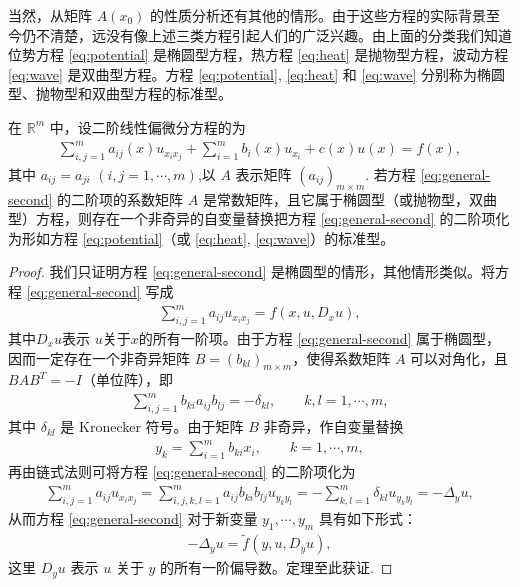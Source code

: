 \documentclass[../../main.tex]{subfiles}%
\begin{document}
当然，从矩阵 $A(x_0)$ 的性质分析还有其他的情形。由于这些方程的实际背景至今仍不清楚，远没有像上述三类方程引起人们的广泛兴趣。由上面的分类我们知道位势方程 \eqref{eq:potential} 是椭圆型方程，热方程 \eqref{eq:heat} 是抛物型方程，波动方程 \eqref{eq:wave} 是双曲型方程。方程 \eqref{eq:potential}, \eqref{eq:heat} 和 \eqref{eq:wave} 分别称为椭圆型、抛物型和双曲型方程的标准型。

\begin{theorem}
在 $\mathbb{R}^m$ 中，设二阶线性偏微分方程的为
\begin{align}
\sum_{i,j=1}^{m} a_{ij}(x) u_{x_i x_j} + \sum_{i=1}^{m} b_i(x) u_{x_i} + c(x) u(x) = f(x), \label{eq:general-second}
\end{align}
其中 $a_{ij}=a_{ji}$ $(i,j=1,\cdots,m)$,以 $A$ 表示矩阵 $(a_{ij})_{m\times m}$.
若方程 \eqref{eq:general-second} 的二阶项的系数矩阵 $A$ 是常数矩阵，且它属于椭圆型（或抛物型，双曲型）方程，则存在一个非奇异的自变量替换把方程 \eqref{eq:general-second} 的二阶项化为形如方程 \eqref{eq:potential}（或 \eqref{eq:heat}, \eqref{eq:wave}）的标准型。
\end{theorem}
\begin{proof}
我们只证明方程 \eqref{eq:general-second} 是椭圆型的情形，其他情形类似。将方程 \eqref{eq:general-second} 写成
\begin{align*}
\sum_{i,j=1}^{m} a_{ij} u_{x_i x_j}= f(x,u,D_x u),
\end{align*}
其中$D_x u$表示 $u$关于$x$的所有一阶项。由于方程 \eqref{eq:general-second} 属于椭圆型，因而一定存在一个非奇异矩阵 $B=(b_{kl})_{m\times m}$，使得系数矩阵 $A$ 可以对角化，且 $BAB^T = -I$（单位阵），即
\begin{align*}
\sum_{i,j=1}^{m} b_{ki} a_{ij} b_{lj} = -\delta_{kl}, \qquad k,l=1,\cdots,m,
\end{align*}
其中 $\delta_{kl}$ 是 Kronecker 符号。由于矩阵 $B$ 非奇异，作自变量替换
\begin{align*}
y_k = \sum_{i=1}^{m} b_{ki} x_i, \qquad k=1,\cdots,m,
\end{align*}
再由链式法则可将方程 \eqref{eq:general-second} 的二阶项化为
\begin{align*}
\sum_{i,j=1}^{m} a_{ij} u_{x_i x_j}
= \sum_{i,j,k,l=1}^{m} a_{ij} b_{ki} b_{lj} u_{y_k y_l}
= -\sum_{k,l=1}^{m} \delta_{kl} u_{y_k y_l}
= -\Delta_y u,
\end{align*}
从而方程 \eqref{eq:general-second} 对于新变量 $y_1,\cdots,y_m$ 具有如下形式：
\begin{align*}
-\Delta_y u = \tilde{f}(y,u,D_y u),
\end{align*}
这里 $D_y u$ 表示 $u$ 关于 $y$ 的所有一阶偏导数。定理至此获证.
\end{proof}
\end{document}
